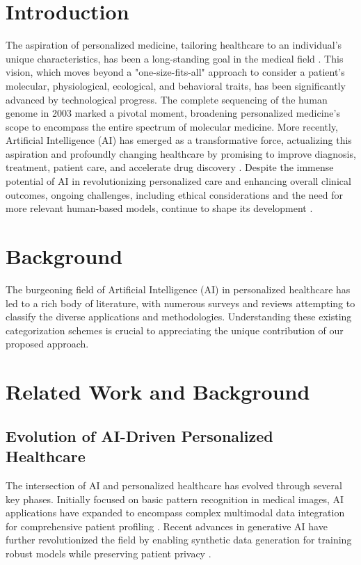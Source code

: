 \documentclass[runningheads]{llncs}
\begin{document}
\section{Introduction}
The aspiration of personalized medicine, tailoring healthcare to an individual's unique characteristics, has been a long-standing goal in the medical field \cite{alum2025artificial}. This vision, which moves beyond a "one-size-fits-all" approach to consider a patient's molecular, physiological, ecological, and behavioral traits, has been significantly advanced by technological progress. The complete sequencing of the human genome in 2003 marked a pivotal moment, broadening personalized medicine's scope to encompass the entire spectrum of molecular medicine. More recently, Artificial Intelligence (AI) has emerged as a transformative force, actualizing this aspiration and profoundly changing healthcare by promising to improve diagnosis, treatment, patient care, and accelerate drug discovery \cite{alum2025artificial}. Despite the immense potential of AI in revolutionizing personalized care and enhancing overall clinical outcomes, ongoing challenges, including ethical considerations and the need for more relevant human-based models, continue to shape its development \cite{alum2025artificial,taherdoost2024ai}.

\section{Background}
The burgeoning field of Artificial Intelligence (AI) in personalized healthcare has led to a rich body of literature, with numerous surveys and reviews attempting to classify the diverse applications and methodologies. Understanding these existing categorization schemes is crucial to appreciating the unique contribution of our proposed approach.

\section{Related Work and Background}

\subsection{Evolution of AI-Driven Personalized Healthcare}
The intersection of AI and personalized healthcare has evolved through several key phases. Initially focused on basic pattern recognition in medical images, AI applications have expanded to encompass complex multimodal data integration for comprehensive patient profiling \cite{generative_ai_2024}. Recent advances in generative AI have further revolutionized the field by enabling synthetic data generation for training robust models while preserving patient privacy \cite{wang2024systematic}.
\end{document}
